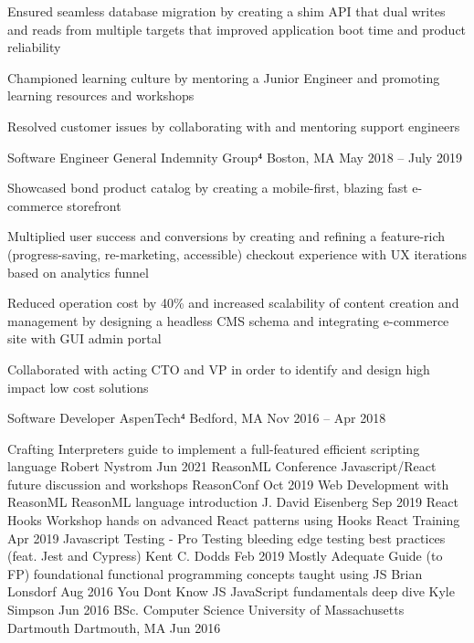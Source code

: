 \documentclass[]{awesome-cv}
\begin{document}
\begin{cventries}
{\begin{cvitems}
		\item {Ensured seamless database migration by creating a shim API that dual writes and reads from multiple targets that improved application boot time and product reliability}
		\item {Championed learning culture by mentoring a Junior Engineer and promoting learning resources and workshops}
		\item {Resolved customer issues by collaborating with and mentoring support engineers}
		\end{cvitems}}
	\cventry
	{Software Engineer}
	{General Indemnity Group⁴}
	{Boston, MA}
	{May 2018 – July 2019}
	{\begin{cvitems}
		\item {Showcased bond product catalog by creating a mobile-first, blazing fast e-commerce storefront}
		\item {Multiplied user success and conversions by creating and refining a feature-rich (progress-saving, re-marketing, accessible) checkout experience with UX iterations based on analytics funnel}
		\item {Reduced operation cost by 40\% and increased scalability of content creation and management by designing a headless CMS schema and integrating e-commerce site with GUI admin portal}
		\item {Collaborated with acting CTO and VP in order to identify and design high impact low cost solutions}
		\end{cvitems}}
	\cventry
	{Software Developer} 
	{AspenTech⁴}
	{Bedford, MA}
	{Nov 2016 – Apr 2018}
	{\begin{cvitems}
		\end{cvitems}}
	\vspace{-8mm}
\end{cventries}

\begin{cvhonors}
	\cvhonor
	{Crafting Interpreters}
	{guide to implement a full-featured efficient scripting language}
	{Robert Nystrom}
	{Jun 2021}
	\cvhonor
	{ReasonML Conference}
	{Javascript/React future discussion and workshops}
	{ReasonConf}
	{Oct 2019}
	\cvhonor
	{Web Development with ReasonML}
	{ReasonML language introduction}
	{J. David Eisenberg}
	{Sep 2019}
	\cvhonor
	{React Hooks Workshop}
	{hands on advanced React patterns using Hooks}
	{React Training}
	{Apr 2019}
	\cvhonor
	{Javascript Testing - Pro Testing}
	{bleeding edge testing best practices (feat. Jest and Cypress)}
	{Kent C. Dodds}
	{Feb 2019}
	\cvhonor
	{Mostly Adequate Guide (to FP)}
	{foundational functional programming concepts taught using JS}
	{Brian Lonsdorf}
	{Aug 2016}
	\cvhonor
	{You Don\textquotesingle{}t Know JS}
	{JavaScript fundamentals deep dive}
	{Kyle Simpson}
	{Jun 2016}
	\cvhonor
	{BSc. Computer Science}
	{University of Massachusetts Dartmouth}
	{Dartmouth, MA}
	{Jun 2016}
\end{cvhonors}
\end{document}
